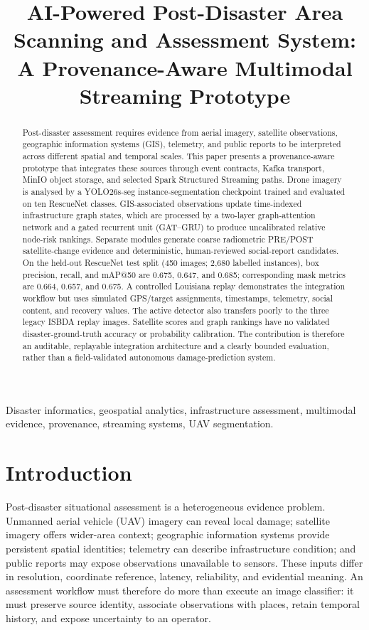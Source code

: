 \documentclass[conference]{IEEEtran}
\title{AI-Powered Post-Disaster Area Scanning and Assessment System: A Provenance-Aware Multimodal Streaming Prototype}
\author{\IEEEauthorblockN{Devaki Prasad, Dibya Dyuti Bhalla, Aryan Khan, Nehaz Khan}
\IEEEauthorblockA{Team 67, Department of Computer Science and Engineering (AI\&ML)\\
PES University, Bengaluru, India\\
Capstone Project Supervisor: Dr. Ashwini K}}
\begin{document}
\maketitle
\begin{abstract}
Post-disaster assessment requires evidence from aerial imagery, satellite observations, geographic information systems (GIS), telemetry, and public reports to be interpreted across different spatial and temporal scales. This paper presents a provenance-aware prototype that integrates these sources through event contracts, Kafka transport, MinIO object storage, and selected Spark Structured Streaming paths. Drone imagery is analysed by a YOLO26s-seg instance-segmentation checkpoint trained and evaluated on ten RescueNet classes. GIS-associated observations update time-indexed infrastructure graph states, which are processed by a two-layer graph-attention network and a gated recurrent unit (GAT--GRU) to produce uncalibrated relative node-risk rankings. Separate modules generate coarse radiometric PRE/POST satellite-change evidence and deterministic, human-reviewed social-report candidates. On the held-out RescueNet test split (450 images; 2,680 labelled instances), box precision, recall, and mAP@50 are 0.675, 0.647, and 0.685; corresponding mask metrics are 0.664, 0.657, and 0.675. A controlled Louisiana replay demonstrates the integration workflow but uses simulated GPS/target assignments, timestamps, telemetry, social content, and recovery values. The active detector also transfers poorly to the three legacy ISBDA replay images. Satellite scores and graph rankings have no validated disaster-ground-truth accuracy or probability calibration. The contribution is therefore an auditable, replayable integration architecture and a clearly bounded evaluation, rather than a field-validated autonomous damage-prediction system.
\end{abstract}
\begin{IEEEkeywords}
Disaster informatics, geospatial analytics, infrastructure assessment, multimodal evidence, provenance, streaming systems, UAV segmentation.
\end{IEEEkeywords}

\section{Introduction}
Post-disaster situational assessment is a heterogeneous evidence problem. Unmanned aerial vehicle (UAV) imagery can reveal local damage; satellite imagery offers wider-area context; geographic information systems provide persistent spatial identities; telemetry can describe infrastructure condition; and public reports may expose observations unavailable to sensors. These inputs differ in resolution, coordinate reference, latency, reliability, and evidential meaning. An assessment workflow must therefore do more than execute an image classifier: it must preserve source identity, associate observations with places, retain temporal history, and expose uncertainty to an operator.
\end{document}
